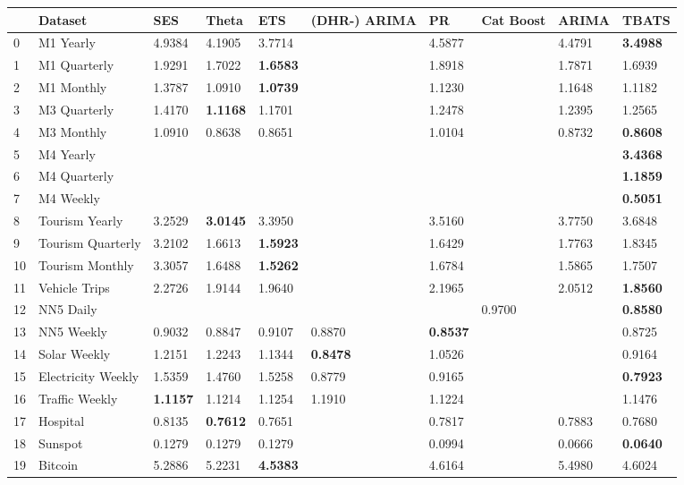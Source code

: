 \begin{tabular}{llllllllll}
\toprule
 & Dataset & SES & Theta & ETS & (DHR-) ARIMA & PR & Cat Boost & ARIMA & TBATS \\
\midrule
0 & M1 Yearly & 4.9384 & 4.1905 & 3.7714 &  & 4.5877 &  & 4.4791 & \textbf{3.4988} \\
1 & M1 Quarterly & 1.9291 & 1.7022 & \textbf{1.6583} &  & 1.8918 &  & 1.7871 & 1.6939 \\
2 & M1 Monthly & 1.3787 & 1.0910 & \textbf{1.0739} &  & 1.1230 &  & 1.1648 & 1.1182 \\
3 & M3 Quarterly & 1.4170 & \textbf{1.1168} & 1.1701 &  & 1.2478 &  & 1.2395 & 1.2565 \\
4 & M3 Monthly & 1.0910 & 0.8638 & 0.8651 &  & 1.0104 &  & 0.8732 & \textbf{0.8608} \\
5 & M4 Yearly &  &  &  &  &  &  &  & \textbf{3.4368} \\
6 & M4 Quarterly &  &  &  &  &  &  &  & \textbf{1.1859} \\
7 & M4 Weekly &  &  &  &  &  &  &  & \textbf{0.5051} \\
8 & Tourism Yearly & 3.2529 & \textbf{3.0145} & 3.3950 &  & 3.5160 &  & 3.7750 & 3.6848 \\
9 & Tourism Quarterly & 3.2102 & 1.6613 & \textbf{1.5923} &  & 1.6429 &  & 1.7763 & 1.8345 \\
10 & Tourism Monthly & 3.3057 & 1.6488 & \textbf{1.5262} &  & 1.6784 &  & 1.5865 & 1.7507 \\
11 & Vehicle Trips & 2.2726 & 1.9144 & 1.9640 &  & 2.1965 &  & 2.0512 & \textbf{1.8560} \\
12 & NN5 Daily &  &  &  &  &  & 0.9700 &  & \textbf{0.8580} \\
13 & NN5 Weekly & 0.9032 & 0.8847 & 0.9107 & 0.8870 & \textbf{0.8537} &  &  & 0.8725 \\
14 & Solar Weekly & 1.2151 & 1.2243 & 1.1344 & \textbf{0.8478} & 1.0526 &  &  & 0.9164 \\
15 & Electricity Weekly & 1.5359 & 1.4760 & 1.5258 & 0.8779 & 0.9165 &  &  & \textbf{0.7923} \\
16 & Traffic Weekly & \textbf{1.1157} & 1.1214 & 1.1254 & 1.1910 & 1.1224 &  &  & 1.1476 \\
17 & Hospital & 0.8135 & \textbf{0.7612} & 0.7651 &  & 0.7817 &  & 0.7883 & 0.7680 \\
18 & Sunspot & 0.1279 & 0.1279 & 0.1279 &  & 0.0994 &  & 0.0666 & \textbf{0.0640} \\
19 & Bitcoin & 5.2886 & 5.2231 & \textbf{4.5383} &  & 4.6164 &  & 5.4980 & 4.6024 \\

\end{tabular}
